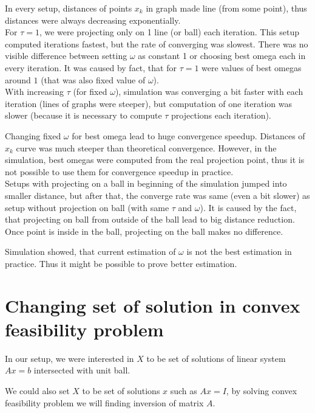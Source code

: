 \documentclass[11pt]{book}
\begin{document}
In every setup, distances of points $x_k$ in graph made line (from some point), thus distances were always decreasing exponentially.\\

For $\tau=1$, we were projecting only on 1 line (or ball) each iteration. This setup computed iterations fastest, but the rate of converging was slowest. There was no visible difference between setting $\omega$ as constant 1 or choosing best omega each in every iteration. It was caused by fact, that for $\tau=1$ were values of best omegas around $1$ (that was also fixed value of $\omega$).\\

With increasing $\tau$ (for fixed $\omega$), simulation was converging a bit faster with each iteration (lines of graphs were steeper), but computation of one iteration was slower (because it is necessary to compute $\tau$ projections each iteration).

Changing fixed $\omega$ for best omega lead to huge convergence speedup. Distances of $x_k$ curve was much steeper than theoretical convergence. However, in the simulation, best omegas were computed from the real projection point, thus it is not possible to use them for convergence speedup in practice.\\

Setups with projecting on a ball in beginning of the simulation jumped into smaller distance, but after that, the converge rate was same (even a bit slower) as setup without projection on ball (with same $\tau$ and $\omega$). It is caused by the fact, that projecting on ball from outside of the ball lead to big distance reduction. Once point is inside in the ball, projecting on the ball makes no difference.

Simulation showed, that current estimation of $\omega$ is not the best estimation in practice. Thus it might be possible to prove better estimation.

\section{Changing set of solution in convex feasibility problem}

In our setup, we were interested in $X$ to be set of solutions of linear system $Ax=b$ intersected with unit ball.

We could also set $X$ to be set of solutions $x$ such as $Ax=I$, by solving convex feasibility problem we will finding inversion of matrix $A$.
\end{document}

